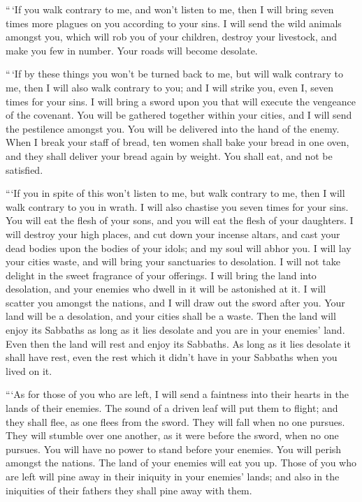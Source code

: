  ``\,`If you walk contrary to me, and won't listen to me,
then I will bring seven times more plagues on you according to your
sins.  I will send the wild animals amongst you, which will
rob you of your children, destroy your livestock, and make you few in
number. Your roads will become desolate.

 ``\,`If by these things you won't be turned back to me,
but will walk contrary to me,  then I will also walk
contrary to you; and I will strike you, even I, seven times for your
sins.  I will bring a sword upon you that will execute the
vengeance of the covenant. You will be gathered together within your
cities, and I will send the pestilence amongst you. You will be
delivered into the hand of the enemy.  When I break your
staff of bread, ten women shall bake your bread in one oven, and they
shall deliver your bread again by weight. You shall eat, and not be
satisfied.

 ```If you in spite of this won't listen to me, but walk
contrary to me,  then I will walk contrary to you in wrath.
I will also chastise you seven times for your sins.  You
will eat the flesh of your sons, and you will eat the flesh of your
daughters.  I will destroy your high places, and cut down
your incense altars, and cast your dead bodies upon the bodies of your
idols; and my soul will abhor you.  I will lay your cities
waste, and will bring your sanctuaries to desolation. I will not take
delight in the sweet fragrance of your offerings.  I will
bring the land into desolation, and your enemies who dwell in it will be
astonished at it.  I will scatter you amongst the nations,
and I will draw out the sword after you. Your land will be a desolation,
and your cities shall be a waste.  Then the land will enjoy
its Sabbaths as long as it lies desolate and you are in your enemies'
land. Even then the land will rest and enjoy its Sabbaths. 
As long as it lies desolate it shall have rest, even the rest which it
didn't have in your Sabbaths when you lived on it.

 ```As for those of you who are left, I will send a
faintness into their hearts in the lands of their enemies. The sound of
a driven leaf will put them to flight; and they shall flee, as one flees
from the sword. They will fall when no one pursues.  They
will stumble over one another, as it were before the sword, when no one
pursues. You will have no power to stand before your enemies.
 You will perish amongst the nations. The land of your
enemies will eat you up.  Those of you who are left will
pine away in their iniquity in your enemies' lands; and also in the
iniquities of their fathers they shall pine away with them.


